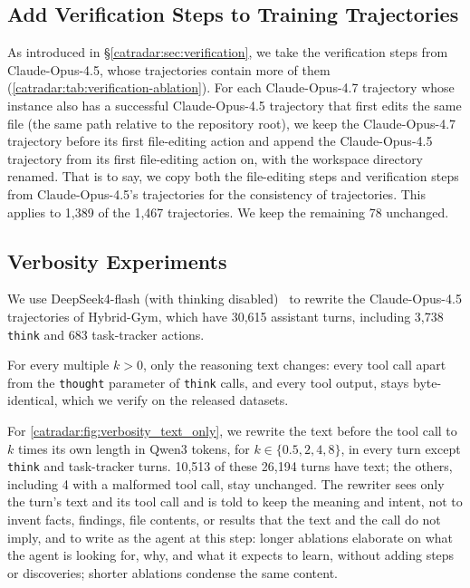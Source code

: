 \subsection{Add Verification Steps to Training Trajectories}
As introduced in \S\ref{catradar:sec:verification}, we take the verification steps from Claude-Opus-4.5, whose trajectories contain more of them (\autoref{catradar:tab:verification-ablation}).
For each Claude-Opus-4.7 trajectory whose instance also has a successful Claude-Opus-4.5 trajectory that first edits the same file (the same path relative to the repository root), we keep the Claude-Opus-4.7 trajectory before its first file-editing action and append the Claude-Opus-4.5 trajectory from its first file-editing action on, with the workspace directory renamed.
That is to say, we copy both the file-editing steps and verification steps from Claude-Opus-4.5's trajectories for the consistency of trajectories.
This applies to 1,389 of the 1,467 trajectories. We keep the remaining 78 unchanged.


\subsection{Verbosity Experiments}
We use DeepSeek4-flash (with thinking disabled)~\cite{deepseekv4} to rewrite the Claude-Opus-4.5 trajectories of Hybrid-Gym, which have 30,615 assistant turns, including 3,738 \texttt{think} and 683 task-tracker actions.

For every multiple $k>0$, only the reasoning text changes: every tool call apart from the \texttt{thought} parameter of \texttt{think} calls, and every tool output, stays byte-identical, which we verify on the released datasets.

 For \autoref{catradar:fig:verbosity_text_only}, we rewrite the text before the tool call to $k$ times its own length in Qwen3 tokens, for $k\in\{0.5,2,4,8\}$, in every turn except \texttt{think} and task-tracker turns.
10,513 of these 26,194 turns have text; the others, including 4 with a malformed tool call, stay unchanged.
The rewriter sees only the turn's text and its tool call and is told to keep the meaning and intent, not to invent facts, findings, file contents, or results that the text and the call do not imply, and to write as the agent at this step: longer ablations elaborate on what the agent is looking for, why, and what it expects to learn, without adding steps or discoveries; shorter ablations condense the same content.

